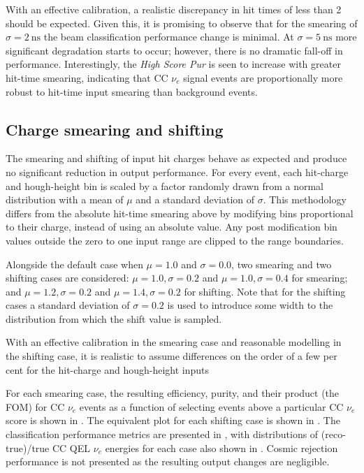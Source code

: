 With an effective calibration, a realistic discrepancy in hit times of less than \SI{2}{}
should be expected. Given this, it is promising to observe that for the smearing of
$\sigma=2~\text{ns}$ the beam classification performance change is minimal. At
$\sigma=5~\text{ns}$ more significant degradation starts to occur; however, there is no dramatic
fall-off in performance. Interestingly, the \emph{High Score Pur} is seen to increase with greater
hit-time smearing, indicating that CC $\nu_{e}$ signal events are proportionally more robust to
hit-time input smearing than background events.

\subsection{Charge smearing and shifting} %
\label{sec:results_robust_charge} %

The smearing and shifting of input hit charges behave as expected and produce no significant
reduction in output performance. For every event, each hit-charge and hough-height bin is scaled
by a factor randomly drawn from a normal distribution with a mean of $\mu$ and a standard
deviation of $\sigma$. This methodology differs from the absolute hit-time smearing above by
modifying bins proportional to their charge, instead of using an absolute value. Any post
modification bin values outside the zero to one input range are clipped to the range boundaries.

Alongside the default case when $\mu=1.0$ and $\sigma=0.0$, two smearing and two shifting cases
are considered: $\mu=1.0,\sigma=0.2$ and $\mu=1.0,\sigma=0.4$ for smearing; and
$\mu=1.2,\sigma=0.2$ and $\mu=1.4,\sigma=0.2$ for shifting. Note that for the shifting cases a
standard deviation of $\sigma=0.2$ is used to introduce some width to the distribution from which
the shift value is sampled.

With an effective calibration in the smearing case and reasonable modelling in the shifting case,
it is realistic to assume differences on the order of a few per cent for the hit-charge and
hough-height inputs

For each smearing case, the resulting efficiency, purity, and their product (the FOM) for CC
$\nu_{e}$ events as a function of selecting events above a particular CC $\nu_{e}$ score is shown
in . The equivalent plot for each shifting case
is shown in . The classification performance
metrics are presented in , with distributions of (reco-true)/true CC
QEL $\nu_{e}$ energies for each case also shown in . Cosmic
rejection performance is not presented as the resulting output changes are negligible.


